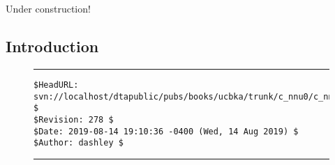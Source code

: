 
\chapter{\cnnuzerolongtitle{}}

\label{cnnu0}

                     {Under construction!}

\section{Introduction}



\vfill
\noindent\begin{figure}[!b]
\noindent\rule[-0.25in]{\textwidth}{1pt}
\begin{tiny}
\begin{verbatim}
$HeadURL: svn://localhost/dtapublic/pubs/books/ucbka/trunk/c_nnu0/c_nnu0.tex $
$Revision: 278 $
$Date: 2019-08-14 19:10:36 -0400 (Wed, 14 Aug 2019) $
$Author: dashley $
\end{verbatim}
\end{tiny}
\noindent\rule[0.25in]{\textwidth}{1pt}
\end{figure}
%

